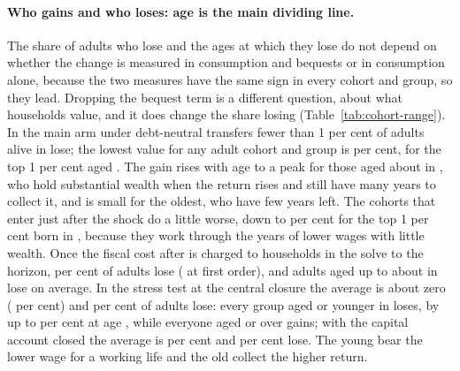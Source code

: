 \paragraph{Who gains and who loses: age is the main dividing line.} The share of adults who lose and the ages at which they lose do not depend on whether the change is measured in consumption and bequests or in consumption alone, because the two measures have the same sign in every cohort and group, so they lead. Dropping the bequest term is a different question, about what households value, and it does change the share losing (Table~\ref{tab:cohort-range}). In the main arm under debt-neutral transfers fewer than 1 per cent of adults alive in \genShockYear{} lose; the lowest value for any adult cohort and group is \genCohMainDnCentralMin{} per cent, for the top 1 per cent aged \genCohMainDnCentralMinAge{}. The gain rises with age to a peak for those aged about \genCohMainDnCentralPeakAge{} in \genShockYear{}, who hold substantial wealth when the return rises and still have many years to collect it, and is small for the oldest, who have few years left. The cohorts that enter just after the shock do a little worse, down to \genCohMainDnCentralMinAll{} per cent for the top 1 per cent born in \genCohMainDnCentralMinAllBirth{}, because they work through the years of lower wages with little wealth. Once the fiscal cost after \genLastFlowYear{} is charged to households in the solve to the horizon, \genCohMainDnfullCentralLosingPctRange{} per cent of adults lose (\genCohMainDnCentralChargedLosingPctRange{} at first order), and adults aged up to about \genCohMainDnfullCentralOldestLosingAgeHi{} in \genShockYear{} lose on average. In the stress test at the central closure the average is about zero (\genCohStressDnCentralAvg{} per cent) and \genCohStressDnCentralLosingPct{} per cent of adults lose: every group aged \genCohStressDnCentralAllLoseUpToAge{} or younger in \genShockYear{} loses, by up to \genCohStressDnCentralMinAbs{} per cent at age \genCohStressDnCentralMinAge{}, while everyone aged \genCohStressDnCentralAllGainFromAge{} or over gains; with the capital account closed the average is \genCohStressDnBoundAvg{} per cent and \genCohStressDnBoundLosingPct{} per cent lose. The young bear the lower wage for a working life and the old collect the higher return.


